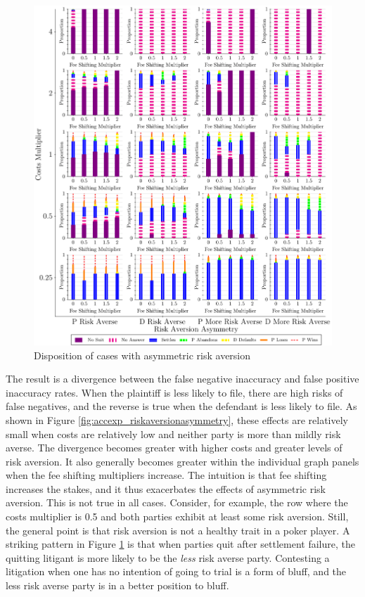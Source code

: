 \documentclass{article}
\begin{document}
\begin{figure}[h!]
\centering
\includegraphics[scale=0.50, trim={0in 0in 0in 0in}, clip]{../Figures/Disposition Varying Risk Aversion Asymmetry.pdf}
\caption{Disposition of cases with asymmetric risk aversion}
\label{fig:disposition_riskaversionasymmetry}
\end{figure}

The result is a divergence between the false negative inaccuracy and false positive inaccuracy rates. When the plaintiff is less likely to file, there are high risks of false negatives, and the reverse is true when the defendant is less likely to file. As shown in Figure \ref{fig:accexp_riskaversionasymmetry}, these effects are relatively small when costs are relatively low and neither party is more than mildly risk averse. The divergence becomes greater with higher costs and greater levels of risk aversion. It also generally becomes greater within the individual graph panels when the fee shifting multipliers increase. The intuition is that fee shifting increases the stakes, and it thus exacerbates the effects of asymmetric risk aversion. This is not true in all cases. Consider, for example, the row where the costs multiplier is 0.5 and both parties exhibit at least some risk aversion. Still, the general point is that risk aversion is not a healthy trait in a poker player. A striking pattern in Figure \ref{fig:disposition_riskaversionasymmetry} is that when parties quit after settlement failure, the quitting litigant is more likely to be the \textit{less} risk averse party. Contesting a litigation when one has no intention of going to trial is a form of bluff, and the less risk averse party is in a better position to bluff. 
\end{document}
